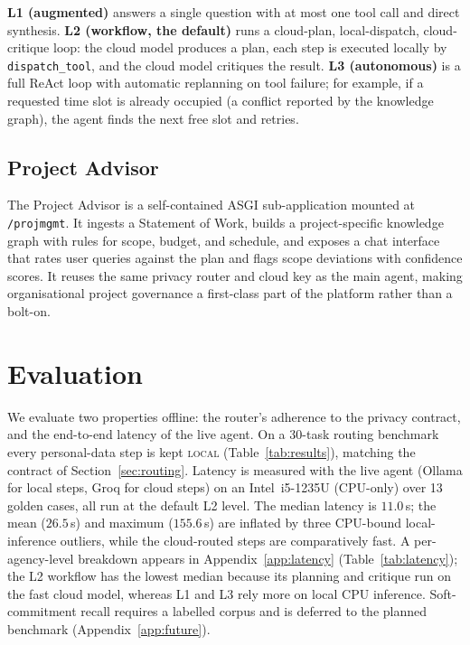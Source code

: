 \documentclass{ecai}
\begin{document}
\textbf{L1 (augmented)} answers a single question with at most one tool call and
direct synthesis. \textbf{L2 (workflow, the default)} runs a cloud-plan,
local-dispatch, cloud-critique loop: the cloud model produces a plan, each step
is executed locally by \texttt{dispatch\_tool}, and the cloud model critiques the
result. \textbf{L3 (autonomous)} is a full ReAct loop \citep{yao2023react} with
automatic replanning on tool failure; for example, if a requested time slot is
already occupied (a conflict reported by the knowledge graph), the agent finds
the next free slot and retries.

\subsection{Project Advisor}

The Project Advisor is a self-contained ASGI sub-application mounted at
\texttt{/projmgmt}. It ingests a Statement of Work, builds a project-specific
knowledge graph with rules for scope, budget, and schedule, and exposes a chat
interface that rates user queries against the plan and flags scope deviations
with confidence scores. It reuses the same privacy router and cloud key as the
main agent, making organisational project governance a first-class part of the
platform rather than a bolt-on.





\section{Evaluation}\label{sec:eval}

We evaluate two properties offline: the router's adherence to the privacy
contract, and the end-to-end latency of the live agent. On a 30-task routing
benchmark every personal-data step is kept \textsc{local}
(Table~\ref{tab:results}), matching the contract of
Section~\ref{sec:routing}. Latency is measured with the live agent (Ollama for
local steps, Groq for cloud steps) on an Intel~i5-1235U (CPU-only) over 13 golden
cases, all run at the default L2 level. The median latency is $11.0$\,s; the mean
($26.5$\,s) and maximum ($155.6$\,s) are inflated by three CPU-bound
local-inference outliers, while the cloud-routed steps are comparatively fast. A
per-agency-level breakdown appears in Appendix~\ref{app:latency}
(Table~\ref{tab:latency}); the L2 workflow has the lowest median because its
planning and critique run on the fast cloud model, whereas L1 and L3 rely more on
local CPU inference. Soft-commitment recall requires a labelled corpus and is
deferred to the planned benchmark (Appendix~\ref{app:future}).
\end{document}
